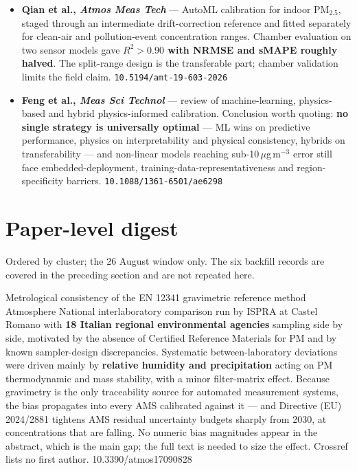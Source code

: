 \documentclass[10pt]{article}
\begin{document}
\begin{itemize}
\item \textbf{Qian et al., \textit{Atmos Meas Tech}} --- AutoML calibration for indoor
PM$_{2.5}$, staged through an intermediate drift-correction reference and fitted
separately for clean-air and pollution-event concentration ranges. Chamber evaluation on
two sensor models gave \textbf{$R^2>0.90$ with NRMSE and sMAPE roughly halved}. The
split-range design is the transferable part; chamber validation limits the field claim.
\texttt{10.5194/amt-19-603-2026}

\item \textbf{Feng et al., \textit{Meas Sci Technol}} --- review of machine-learning,
physics-based and hybrid physics-informed calibration. Conclusion worth quoting:
\textbf{no single strategy is universally optimal} --- ML wins on predictive performance,
physics on interpretability and physical consistency, hybrids on transferability --- and
non-linear models reaching sub-10\,$\mu$g\,m$^{-3}$ error still face embedded-deployment,
training-data-representativeness and region-specificity barriers.
\texttt{10.1088/1361-6501/ae6298}
\end{itemize}

\clearpage

\section*{\sffamily\bfseries\color{Deep}Paper-level digest}
\vspace{-1.5mm}{\color{Amber}\rule{\linewidth}{1.1pt}}\vspace{1mm}

{\fontsize{7.4}{9}\selectfont\color{Slate}Ordered by cluster; the 26 August window only.
The six backfill records are covered in the preceding section and are not repeated here.\par}


{Metrological consistency of the EN 12341 gravimetric reference method}
{Atmosphere}
{National interlaboratory comparison run by ISPRA at Castel Romano with \textbf{18
Italian regional environmental agencies} sampling side by side, motivated by the absence
of Certified Reference Materials for PM and by known sampler-design discrepancies.
Systematic between-laboratory deviations were driven mainly by \textbf{relative humidity
and precipitation} acting on PM thermodynamic and mass stability, with a minor
filter-matrix effect. Because gravimetry is the only traceability source for automated
measurement systems, the bias propagates into every AMS calibrated against it --- and
Directive (EU) 2024/2881 tightens AMS residual uncertainty budgets sharply from 2030,
at concentrations that are falling. No numeric bias magnitudes appear in the abstract,
which is the main gap; the full text is needed to size the effect. Crossref lists no
first author.}
{10.3390/atmos17090828}
\end{document}
